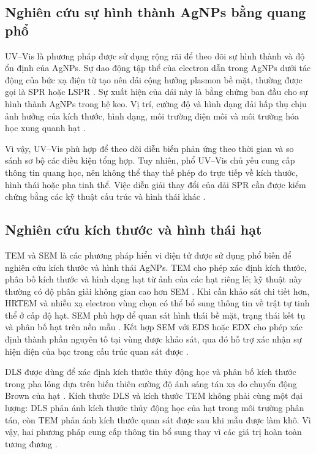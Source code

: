 \subsection{Nghiên cứu sự hình thành AgNPs bằng quang phổ}
UV--Vis là phương pháp được sử dụng rộng rãi để theo dõi sự hình thành và độ ổn định của AgNPs.
Sự dao động tập thể của electron dẫn trong AgNPs dưới tác động của bức xạ điện từ tạo nên dải cộng hưởng plasmon bề mặt, thường được gọi là SPR hoặc LSPR \parencite{zhang2016}.
Sự xuất hiện của dải này là bằng chứng ban đầu cho sự hình thành AgNPs trong hệ keo.
Vị trí, cường độ và hình dạng dải hấp thụ chịu ảnh hưởng của kích thước, hình dạng, môi trường điện môi và môi trường hóa học xung quanh hạt \parencite{zhang2016}.
\par
Vì vậy, UV--Vis phù hợp để theo dõi diễn biến phản ứng theo thời gian và so sánh sơ bộ các điều kiện tổng hợp.
Tuy nhiên, phổ UV--Vis chủ yếu cung cấp thông tin quang học, nên không thể thay thế phép đo trực tiếp về kích thước, hình thái hoặc pha tinh thể.
Việc diễn giải thay đổi của dải SPR cần được kiểm chứng bằng các kỹ thuật cấu trúc và hình thái khác \parencite{pryshchepa2020}.

\subsection{Nghiên cứu kích thước và hình thái hạt}
TEM và SEM là các phương pháp hiển vi điện tử được sử dụng phổ biến để nghiên cứu kích thước và hình thái AgNPs.
TEM cho phép xác định kích thước, phân bố kích thước và hình dạng hạt từ ảnh của các hạt riêng lẻ; kỹ thuật này thường có độ phân giải không gian cao hơn SEM \parencite{zhang2016}.
Khi cần khảo sát chi tiết hơn, HRTEM và nhiễu xạ electron vùng chọn có thể bổ sung thông tin về trật tự tinh thể ở cấp độ hạt.
SEM phù hợp để quan sát hình thái bề mặt, trạng thái kết tụ và phân bố hạt trên nền mẫu \parencite{zhang2016}.
Kết hợp SEM với EDS hoặc EDX cho phép xác định thành phần nguyên tố tại vùng được khảo sát, qua đó hỗ trợ xác nhận sự hiện diện của bạc trong cấu trúc quan sát được \parencite{zhang2016}.
\par
DLS được dùng để xác định kích thước thủy động học và phân bố kích thước trong pha lỏng dựa trên biến thiên cường độ ánh sáng tán xạ do chuyển động Brown của hạt \parencite{zhang2016}.
Kích thước DLS và kích thước TEM không phải cùng một đại lượng: DLS phản ánh kích thước thủy động học của hạt trong môi trường phân tán, còn TEM phản ánh kích thước quan sát được sau khi mẫu được làm khô.
Vì vậy, hai phương pháp cung cấp thông tin bổ sung thay vì các giá trị hoàn toàn tương đương \parencite{zhang2016,pryshchepa2020}.

